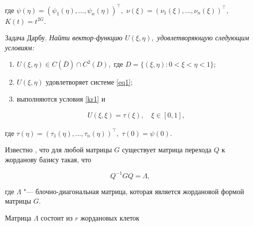 где \rm $\psi(\eta)=(\psi_1(\eta),\dots ,\psi_n(\eta))^\top,$ $ \nu(\xi)=(\nu_1(\xi),\dots,\nu_n(\xi))^\top,$ $ K(t)=t^{2G}$.





\smallskip



{\small \sc Задача Дарбу.} \it  Найти вектор-функцию $U(\xi, \eta),$ удовлетворяющую следующим условиям\/{\rm:}

\begin{enumerate}

\item[\rm 1)] $U(\xi,\eta)\in C(\bar{D})\cap C^2(D),$ где $D=\{(\xi, \eta): 0< \xi<\eta <1 \};$

\item[\rm 2)] $U(\xi,\eta)$ удовлетворяет системе  \rm \eqref{eq1}; \it

\item[\rm 3)] выполняются условия \eqref{kr1} и 

\begin{gather}

  \label{krD1}

  U(\xi,\xi)=\tau(\xi), \quad  \xi \in \left[0, 1\right],

\end{gather}

\end{enumerate}

где \rm $\tau(\eta)=(\tau_1(\eta),\dots ,\tau_n(\eta))^\top,$ $ \tau(0)=\psi(0)$.

\smallskip



Известно \cite{gant}, что для любой матрицы $G$ существует матрица перехода $Q$ к жорданову базису такая, что 

\begin{equation*}

 Q^{-1} G Q=\Lambda, 

\end{equation*}

где $\Lambda$ "--- блочно-диагональная матрица, которая является жордановой формой матрицы $G$. 

Матрица $\Lambda$ состоит из $r$ жордановых клеток

